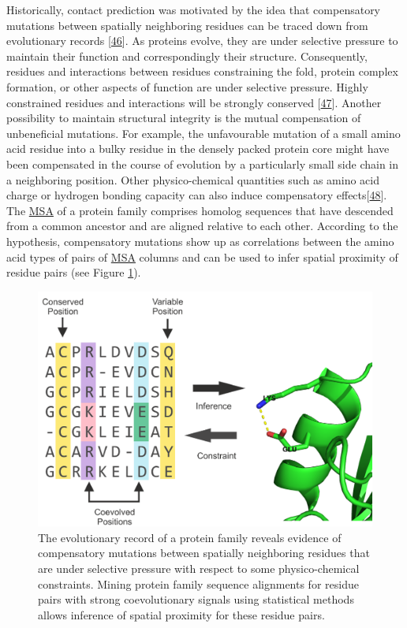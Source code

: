 \documentclass[11pt,a4paper,twoside]{book}
\theoremstyle{definition}
\theoremstyle{definition}
\theoremstyle{remark}
\begin{document}
Historically, contact prediction was motivated by the idea that
compensatory mutations between spatially neighboring residues can be
traced down from evolutionary records
{[}\protect\hyperlink{ref-Gobel1994}{46}{]}. As proteins evolve, they
are under selective pressure to maintain their function and
correspondingly their structure. Consequently, residues and interactions
between residues constraining the fold, protein complex formation, or
other aspects of function are under selective pressure. Highly
constrained residues and interactions will be strongly conserved
{[}\protect\hyperlink{ref-Godzik1989}{47}{]}. Another possibility to
maintain structural integrity is the mutual compensation of unbeneficial
mutations. For example, the unfavourable mutation of a small amino acid
residue into a bulky residue in the densely packed protein core might
have been compensated in the course of evolution by a particularly small
side chain in a neighboring position. Other physico-chemical quantities
such as amino acid charge or hydrogen bonding capacity can also induce
compensatory effects{[}\protect\hyperlink{ref-Neher1994}{48}{]}. The
\protect\hyperlink{abbrev}{MSA} of a protein family comprises homolog
sequences that have descended from a common ancestor and are aligned
relative to each other. According to the hypothesis, compensatory
mutations show up as correlations between the amino acid types of pairs
of \protect\hyperlink{abbrev}{MSA} columns and can be used to infer
spatial proximity of residue pairs (see Figure
\ref{fig:correlated-mutations}).









\begin{figure}

{\centering \includegraphics[width=0.9\linewidth]{img/intro/correlated-mutations-transparent} 

}

\caption{The evolutionary record of a protein
family reveals evidence of compensatory mutations between spatially
neighboring residues that are under selective pressure with respect to
some physico-chemical constraints. Mining protein family sequence
alignments for residue pairs with strong coevolutionary signals using
statistical methods allows inference of spatial proximity for these
residue pairs.}\label{fig:correlated-mutations}
\end{figure}
\end{document}
